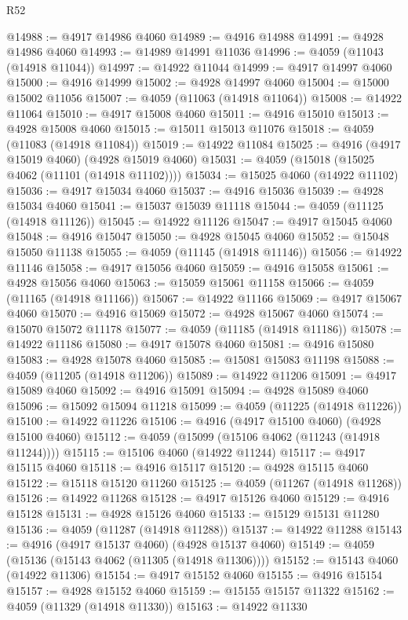 \begin{lexlean}{R52}
\begin{coremodule}
@14988 := @4917 @14986 @4060
@14989 := @4916 @14988
@14991 := @4928 @14986 @4060
@14993 := @14989 @14991 @11036
@14996 := @4059 (@11043 (@14918 @11044))
@14997 := @14922 @11044
@14999 := @4917 @14997 @4060
@15000 := @4916 @14999
@15002 := @4928 @14997 @4060
@15004 := @15000 @15002 @11056
@15007 := @4059 (@11063 (@14918 @11064))
@15008 := @14922 @11064
@15010 := @4917 @15008 @4060
@15011 := @4916 @15010
@15013 := @4928 @15008 @4060
@15015 := @15011 @15013 @11076
@15018 := @4059 (@11083 (@14918 @11084))
@15019 := @14922 @11084
@15025 := @4916 (@4917 @15019 @4060) (@4928 @15019 @4060)
@15031 := @4059 (@15018 (@15025 @4062 (@11101 (@14918 @11102))))
@15034 := @15025 @4060 (@14922 @11102)
@15036 := @4917 @15034 @4060
@15037 := @4916 @15036
@15039 := @4928 @15034 @4060
@15041 := @15037 @15039 @11118
@15044 := @4059 (@11125 (@14918 @11126))
@15045 := @14922 @11126
@15047 := @4917 @15045 @4060
@15048 := @4916 @15047
@15050 := @4928 @15045 @4060
@15052 := @15048 @15050 @11138
@15055 := @4059 (@11145 (@14918 @11146))
@15056 := @14922 @11146
@15058 := @4917 @15056 @4060
@15059 := @4916 @15058
@15061 := @4928 @15056 @4060
@15063 := @15059 @15061 @11158
@15066 := @4059 (@11165 (@14918 @11166))
@15067 := @14922 @11166
@15069 := @4917 @15067 @4060
@15070 := @4916 @15069
@15072 := @4928 @15067 @4060
@15074 := @15070 @15072 @11178
@15077 := @4059 (@11185 (@14918 @11186))
@15078 := @14922 @11186
@15080 := @4917 @15078 @4060
@15081 := @4916 @15080
@15083 := @4928 @15078 @4060
@15085 := @15081 @15083 @11198
@15088 := @4059 (@11205 (@14918 @11206))
@15089 := @14922 @11206
@15091 := @4917 @15089 @4060
@15092 := @4916 @15091
@15094 := @4928 @15089 @4060
@15096 := @15092 @15094 @11218
@15099 := @4059 (@11225 (@14918 @11226))
@15100 := @14922 @11226
@15106 := @4916 (@4917 @15100 @4060) (@4928 @15100 @4060)
@15112 := @4059 (@15099 (@15106 @4062 (@11243 (@14918 @11244))))
@15115 := @15106 @4060 (@14922 @11244)
@15117 := @4917 @15115 @4060
@15118 := @4916 @15117
@15120 := @4928 @15115 @4060
@15122 := @15118 @15120 @11260
@15125 := @4059 (@11267 (@14918 @11268))
@15126 := @14922 @11268
@15128 := @4917 @15126 @4060
@15129 := @4916 @15128
@15131 := @4928 @15126 @4060
@15133 := @15129 @15131 @11280
@15136 := @4059 (@11287 (@14918 @11288))
@15137 := @14922 @11288
@15143 := @4916 (@4917 @15137 @4060) (@4928 @15137 @4060)
@15149 := @4059 (@15136 (@15143 @4062 (@11305 (@14918 @11306))))
@15152 := @15143 @4060 (@14922 @11306)
@15154 := @4917 @15152 @4060
@15155 := @4916 @15154
@15157 := @4928 @15152 @4060
@15159 := @15155 @15157 @11322
@15162 := @4059 (@11329 (@14918 @11330))
@15163 := @14922 @11330

\end{coremodule}
\end{lexlean}

